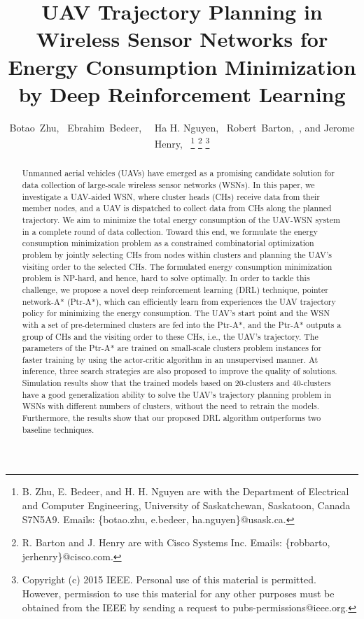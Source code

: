 \documentclass[journal]{IEEEtran}
\begin{document}
	\title{UAV Trajectory Planning in Wireless Sensor Networks for Energy Consumption Minimization by Deep Reinforcement Learning}	
	\author{Botao~Zhu,~\IEEEmembership{}
		Ebrahim~Bedeer,~
		~Ha H. Nguyen,~ Robert~Barton,~, and Jerome Henry,~
		\thanks{B. Zhu, E. Bedeer, and H. H. Nguyen are with the Department of Electrical and Computer Engineering, University of Saskatchewan, Saskatoon, Canada S7N5A9. Emails: \{botao.zhu, e.bedeer, ha.nguyen\}@usask.ca.}
		\thanks{R. Barton and J. Henry are with Cisco Systems Inc. Emails: \{robbarto, jerhenry\}@cisco.com.} 
		\thanks{Copyright (c) 2015 IEEE. Personal use of this material is permitted. However, permission to use this material for any other purposes must be obtained from the IEEE by sending a request to pubs-permissions@ieee.org.}
	}%
% 	
	
	\maketitle
	\begin{abstract}
		Unmanned aerial vehicles (UAVs) have emerged as a promising candidate solution for data collection of large-scale wireless sensor networks (WSNs). In this paper, we investigate a UAV-aided WSN, where cluster heads (CHs) receive data from their member nodes, and a UAV is dispatched to collect data from CHs along the planned trajectory. We aim to minimize the total energy consumption of the UAV-WSN system in a complete round of data collection. Toward this end, we formulate the energy consumption minimization problem as a constrained combinatorial optimization problem by jointly selecting CHs from nodes within clusters and planning the UAV's visiting order to the selected CHs. The formulated energy consumption minimization problem is NP-hard, and hence, hard to solve optimally. In order to tackle this challenge, we propose a novel deep reinforcement learning (DRL) technique, pointer network-A* (Ptr-A*), which can efficiently learn from experiences the UAV trajectory policy for minimizing the energy consumption. The UAV's start point and the WSN with a set of pre-determined clusters are fed into the Ptr-A*, and the Ptr-A* outputs a group of CHs and the visiting order to these CHs, i.e., the UAV's trajectory. The parameters of the Ptr-A* are trained on small-scale clusters problem instances for faster training by using the actor-critic algorithm in an unsupervised manner. At inference, three search strategies are also proposed to improve the quality of solutions. Simulation results show that the trained models based on 20-clusters and 40-clusters have a good generalization ability to solve the UAV's trajectory planning problem in WSNs with different numbers of clusters, without the need to retrain the models. Furthermore, the results show that our proposed DRL algorithm outperforms two baseline techniques.
	\end{abstract}
	
\end{document}
